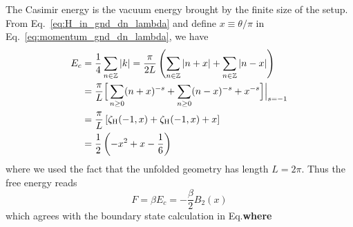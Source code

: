 The Casimir energy is the vacuum energy brought by the finite size of the setup. From Eq.~\eqref{eq:H_in_gnd_dn_lambda} and define $x\equiv\theta/\pi$ in Eq.~\eqref{eq:momentum_gnd_dn_lambda}, we have
\begin{equation}
\begin{aligned}
E_c &= \frac{1}{4} \sum_{n \in \mathbb{Z}} | k| = \frac{\pi}{2L} \left( \sum_{n \in \mathbb{Z}}  | n + x | + \sum_{n \in \mathbb{Z}}  | n - x |  \right) \\  
&= \frac{\pi}{L} \Big[\sum_{n \ge 0 } ( n + x )^{-s} + \sum_{n \ge 0 }  ( n - x)^{-s}  +   x^{-s} \Big]\Big|_{s = -1} \\
&= \frac{\pi}{L} \left[ \zeta_{\rm H}( -1, x ) + \zeta_{\rm H}( -1, x ) +  x \right] \\
&= \frac{1}{2} \left( - x^2 + x - \frac{1}{6}\right)
\end{aligned}
\end{equation}
where we used the fact that the unfolded geometry has length $L=2\pi$. Thus the free energy reads
\begin{equation}
F = \beta E_c = - \frac{\beta}{2} B_2( x) 
\end{equation}
which agrees with the boundary state calculation in Eq.{\bf\color{red}where}


